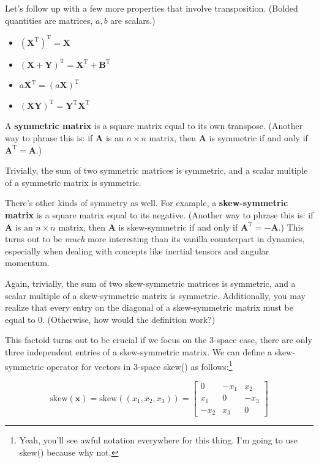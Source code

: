 \documentclass[
  letterpaper,
  DIV=11,
  numbers=noendperiod]{scrreprt}
\providecommand{\tightlist}{%
  \setlength{\itemsep}{0pt}\setlength{\parskip}{0pt}}\usepackage{longtable,booktabs,array}
\begin{document}
Let's follow up with a few more properties that involve transposition.
(Bolded quantities are matrices, \(a, b\) are scalars.)

\begin{itemize}
\tightlist
\item
  \(\left(\textbf{X}^\text{T}\right)^\text{T} = \textbf{X}\)
\item
  \((\textbf{X}+\textbf{Y})^\text{T} = \textbf{X}^\text{T} + \textbf{B}^\text{T}\)
\item
  \(a\textbf{X}^\text{T} = (a\textbf{X})^\text{T}\)
\item
  \((\textbf{X}\textbf{Y})^\text{T} = \textbf{Y}^\text{T} \textbf{X}^\text{T}\)
\end{itemize}

A \textbf{symmetric matrix} is a square matrix equal to its own
transpose. (Another way to phrase this is: if \(\textbf{A}\) is an
\(n\times n\) matrix, then \(\textbf{A}\) is symmetric if and only if
\(\textbf{A}^\text{T} = \textbf{A}\).)

Trivially, the sum of two symmetric matrices is symmetric, and a scalar
multiple of a symmetric matrix is symmetric.

There's other kinds of symmetry as well. For example, a
\textbf{skew-symmetric matrix} is a square matrix equal to its negative.
(Another way to phrase this is: if \(\textbf{A}\) is an \(n\times n\)
matrix, then \(\textbf{A}\) is skew-symmetric if and only if
\(\textbf{A}^\text{T} = -\textbf{A}\).) This turns out to be \emph{much}
more interesting than its vanilla counterpart in dynamics, especially
when dealing with concepts like inertial tensors and angular momentum.

Again, trivially, the sum of two skew-symmetric matrices is symmetric,
and a scalar multiple of a skew-symmetric matrix is symmetric.
Additionally, you may realize that every entry on the diagonal of a
skew-symmetric matrix must be equal to 0. (Otherwise, how would the
definition work?)

This factoid turns out to be crucial if we focus on the 3-space case,
there are only three independent entries of a skew-symmetric matrix. We
can define a skew-symmetric operator for vectors in 3-space skew() as
follows:\footnote{Yeah, you'll see awful notation everywhere for this
  thing. I'm going to use skew() because why not.}

\[\text{skew}(\boldsymbol{x}) = \text{skew}((x_1, x_2, x_3)) = \begin{bmatrix} 0 & -x_1 & x_2 \\ x_1 & 0 & -x_3 \\ -x_2 & x_3 & 0\end{bmatrix} \]
\end{document}
